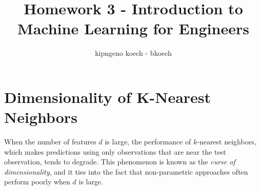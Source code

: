 \documentclass[a3paper,12pt]{extarticle} %
\begin{document}
\author{kipngeno koech - bkoech}
\title{Homework 3 - Introduction to Machine Learning for Engineers}   
\maketitle

\medskip

\maketitle
\section{Dimensionality of K-Nearest Neighbors}


When the number of features $d$ is large, the performance of $k$-nearest neighbors, which makes predictions using only observations that are near the test observation, tends to degrade. This phenomenon is known as the \textit{curse of dimensionality}, and it ties into the fact that non-parametric approaches often perform poorly when $d$ is large.
\end{document}
